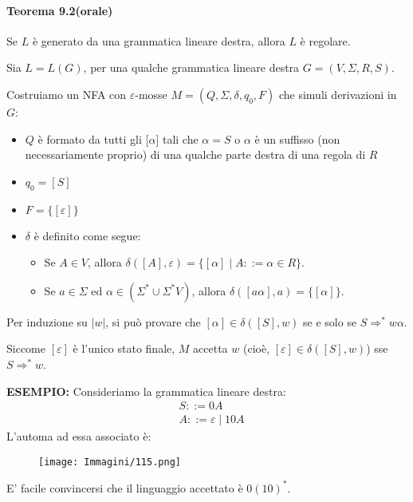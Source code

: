 \documentclass{article}
\begin{document}
\paragraph{Teorema 9.2(orale)}
\label{teorema-9.2}
\text{}
\newline
Se $L$ è generato da una grammatica lineare destra, allora $L$ è regolare.

\begin{tcolorbox}[colback=yellow!10!white, colframe=yellow!50!black, title=Dimostrazione]
    Sia $L = L(G)$, per una qualche grammatica lineare destra $G = (V,\Sigma,R,S)$.

    Costruiamo un NFA con $\varepsilon$-mosse $M = (Q,\Sigma,\delta,q_0,F)$ che simuli derivazioni in $G$:
    \begin{itemize}
        \item $Q$ è formato da tutti gli [$\alpha$] tali che $\alpha = S$ o $\alpha$ è un suffisso (non necessariamente proprio) di una qualche parte destra di una regola di $R$
        \item $q_0 = [S]$
        \item $F = \{[\varepsilon]\}$
        \item $\delta$ è definito come segue:
        \begin{itemize}
            \item Se $A \in V$, allora $\delta([A],\varepsilon) = \{[\alpha] \mid A ::= \alpha \in R\}$.
            \item Se $a \in \Sigma$ ed $\alpha \in (\Sigma^* \cup \Sigma^*V)$, allora $\delta([a\alpha],a) = \{[\alpha]\}$.
        \end{itemize}
    \end{itemize}
    Per induzione su $|w|$, si può provare che $[\alpha] \in \delta([S],w)$ se e solo se $S \Rightarrow^* w\alpha$.

    Siccome $[\varepsilon]$ è l'unico stato finale, $M$ accetta $w$ (cioè, $[\varepsilon] \in \delta([S],w)$) sse $S \Rightarrow^* w$.
\end{tcolorbox}

\textbf{ESEMPIO:} Consideriamo la grammatica lineare destra:
\begin{align*}
    &S ::= 0A \\
    &A ::= \varepsilon \mid 10A
\end{align*}
L'automa ad essa associato è:

\begin{figure}[H]
    \centering
    \texttt{[image: Immagini/115.png]}
    \label{fig:dfa_example}
\end{figure}
E' facile convincersi che il linguaggio accettato è $0(10)^*$.
\end{document}
